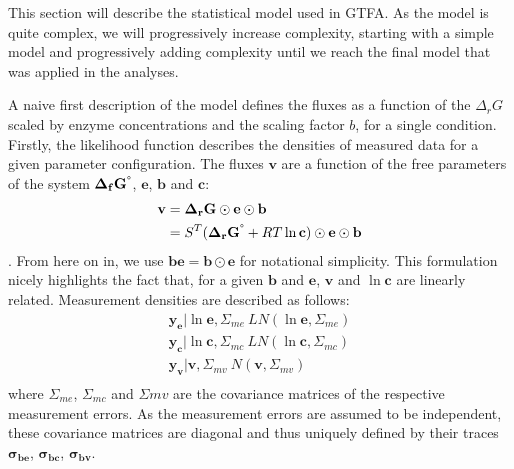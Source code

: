\documentclass[10pt,letterpaper]{article}
\newcommand{\sdgf}{\Delta_fG^{\degree}}
\newcommand{\dgr}{\Delta_rG}
\newcommand{\sdgr}{\Delta_rG^{\degree}}
\newcommand{\bsdgf}{\mathbf{\sdgf}}
\newcommand{\bdgr}{\mathbf{\dgr}}
\newcommand{\bsdgr}{\mathbf{\sdgr}}
\newcommand{\be}{\mathbf{e}}
\newcommand{\bc}{\mathbf{c}}
\newcommand{\bb}{\mathbf{b}}
\newcommand{\bv}{\mathbf{v}}
\newcommand{\bbe}{\mathbf{be}}
\begin{document}
This section will describe the statistical model used in GTFA.
As the model is quite complex, we will progressively increase complexity, starting with a simple model and progressively adding complexity until we reach the final model that was applied in the analyses.

A naive first description of the model defines the fluxes as a function of the $\dgr$ scaled by enzyme concentrations and the scaling factor $b$, for a single condition.
Firstly, the likelihood function describes the densities of measured data for a given parameter configuration.
The fluxes $\bv$ are a function of the free parameters of the system $\bsdgf$, $\be$, $\bb$ and $\bc$:
\begin{align}
    \bv &= \bdgr \odot \be \odot \bb \\
        &= S^T (\bsdgr + RT\ln{\bc}) \odot \be \odot \bb \\
\end{align}
.
From here on in, we use $\bbe=\bb \odot \be$ for notational simplicity.
This formulation nicely highlights the fact that, for a given $\bb$ and $\be$, $\bv$ and $\ln{\mathbf{c}}$ are linearly related.
Measurement densities are described as follows:
\begin{align*}
    \mathbf{y_{e}}|\ln{\be}, \Sigma_{me} ~ LN(\ln{\be}, \Sigma_{me}) \\
    \mathbf{y_{c}}|\ln{\bc}, \Sigma_{mc} ~ LN(\ln{\bc}, \Sigma_{mc}) \\
    \mathbf{y_{v}}|\bv, \Sigma_{mv} ~ N(\bv, \Sigma_{mv}) \\
\end{align*}
where $\Sigma_{me}$, $\Sigma_{mc}$ and $\Sigma{mv}$ are the covariance matrices of the respective measurement errors.
As the measurement errors are assumed to be independent, these covariance matrices are diagonal and thus uniquely defined by their traces $\mathbf{\sigma_{be}}$, $\mathbf{\sigma_{bc}}$, $\mathbf{\sigma_{bv}}$.
\end{document}
